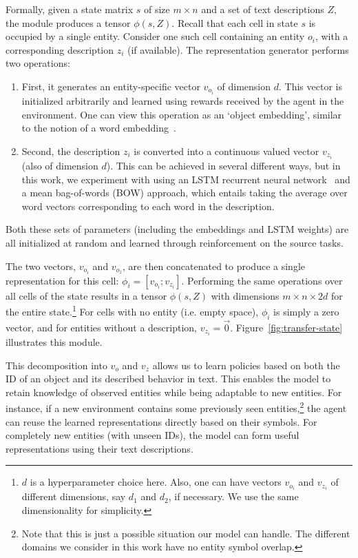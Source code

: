 \color{black}
Formally, given a state matrix $s$ of size $m \times n$ and a set of text descriptions $Z$, the module produces a tensor $\phi(s, Z)$. Recall that each cell in state $s$ is occupied by a single entity. Consider one such cell containing an entity $o_i$, with a corresponding description $z_i$ (if available). The representation generator performs two operations:
\begin{enumerate}
\item First, it generates an entity-specific vector $v_{o_i}$ of dimension $d$. This vector is initialized arbitrarily and learned using rewards received by the agent in the environment. One can view this operation as an `object embedding', similar to the notion of a word embedding~.
\item Second, the description $z_i$ is converted into a continuous valued vector  \textbf{$v_{z_i}$} (also of dimension $d$). This can be achieved in several different ways, but in this work, we experiment with using an LSTM recurrent neural network~\cite{hochreiter1997long} and a mean bag-of-words (BOW) approach, which entails taking the average over word vectors corresponding to each word in the description. 
\end{enumerate}
Both these sets of parameters (including the embeddings and LSTM weights) are all initialized at random and learned through reinforcement on the source tasks.

The two vectors, $v_{o_i}$ and  $v_{o_z}$,  are then concatenated to produce a single representation for this cell: $\phi_i = [v_{o_i};v_{z_i}]$. Performing the same operations over all cells of the state results in a tensor $\phi(s,Z)$ with dimensions $m \times n \times 2d$ for the entire state.\footnote{$d$ is a hyperparameter choice here. Also, one can have vectors $v_{o_i}$ and $v_{z_i}$ of different dimensions, say $d_1$ and $d_2$, if necessary. We use the same dimensionality for simplicity.} For cells with no entity (i.e. empty space), $\phi_i$ is simply a zero vector, and for entities without a description, $v_{z_i} = \vec{0}$.  Figure~\ref{fig:transfer-state} illustrates this module.

This decomposition into $v_o$ and $v_z$ allows us to learn policies based on both the ID of an object and its described behavior in text. This enables the model to retain knowledge of observed entities while being adaptable to new entities. For instance, if a new environment contains some previously seen entities,\footnote{Note that this is just a possible situation our model can handle. The different domains we consider in this work have no entity symbol overlap.} the agent can reuse the learned representations directly based on their symbols. For completely new entities (with unseen IDs), the model can form useful representations using their text descriptions. 

